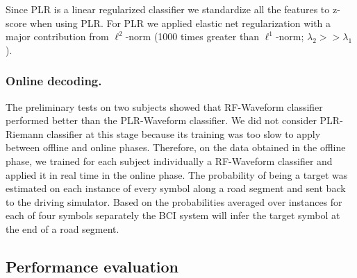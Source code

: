 \documentclass[12pt]{iopart}
\begin{document}
Since PLR is a linear regularized classifier 
we standardize all the features to z-score when
using PLR. For PLR we applied elastic net regularization
with a major contribution from $\ell^2$-norm (1000 times greater than $\ell^1$-norm; $\lambda_2 >> \lambda_1$).




\subsubsection*{Online decoding.}
The preliminary tests on two subjects showed that RF-Waveform classifier
performed better than the PLR-Waveform classifier. We did not consider
PLR-Riemann classifier at this stage because its training
was too slow to apply between offline and online phases.
Therefore, on the data obtained in the offline phase, we trained for each subject individually a RF-Waveform classifier
and applied it in real time in the online phase.
The probability of being a target was estimated on each instance of every symbol along a road segment and sent back to the driving simulator. Based on the probabilities averaged over instances for each of four symbols separately the BCI system will infer the target symbol at the end of a road segment.


\subsection{Performance evaluation}
\end{document}
